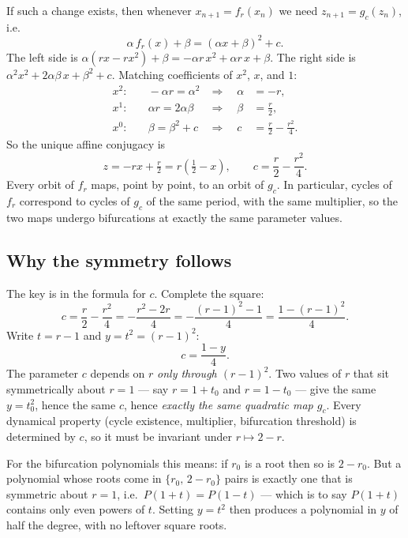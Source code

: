 \documentclass[11pt]{article}
\begin{document}
If such a change exists, then whenever $x_{n+1}=f_r(x_n)$ we need
$z_{n+1}=g_c(z_n)$, i.e.\
\[
\alpha\, f_r(x) + \beta = (\alpha x+\beta)^2 + c.
\]
The left side is $\alpha(rx-rx^2)+\beta = -\alpha r\,x^2 + \alpha r\,x+\beta$.
The right side is $\alpha^2 x^2+2\alpha\beta\,x+\beta^2+c$.  Matching
coefficients of $x^2$, $x$, and $1$:
\begin{align*}
x^2\!: & \quad -\alpha r = \alpha^2
        & \Longrightarrow\quad \alpha &= -r, \\
x^1\!: & \quad \alpha r = 2\alpha\beta
        & \Longrightarrow\quad \beta &= \tfrac{r}{2}, \\
x^0\!: & \quad \beta = \beta^2+c
        & \Longrightarrow\quad c &= \tfrac{r}{2}-\tfrac{r^2}{4}.
\end{align*}
So the unique affine conjugacy is
\begin{equation}
\label{eq:conjugacy}
z = -r x + \tfrac{r}{2} = r\!\left(\tfrac12 - x\right), \qquad
c = \frac{r}{2} - \frac{r^2}{4}.
\end{equation}
Every orbit of $f_r$ maps, point by point, to an orbit of $g_c$.  In
particular, cycles of $f_r$ correspond to cycles of $g_c$ of the same period,
with the same multiplier, so the two maps undergo bifurcations at exactly the
same parameter values.

\subsection{Why the symmetry follows}

The key is in the formula for $c$.  Complete the square:
\begin{equation}
\label{eq:c-of-y}
c = \frac{r}{2}-\frac{r^2}{4}
  = -\frac{r^2-2r}{4}
  = -\frac{(r-1)^2-1}{4}
  = \frac{1-(r-1)^2}{4}.
\end{equation}
Write $t=r-1$ and $y=t^2=(r-1)^2$:
\[
c = \frac{1-y}{4}.
\]
The parameter $c$ depends on $r$ \emph{only through $(r-1)^2$}.  Two values of
$r$ that sit symmetrically about $r=1$ --- say $r=1+t_0$ and $r=1-t_0$ ---
give the same $y=t_0^2$, hence the same $c$, hence \emph{exactly the same
quadratic map $g_c$}.  Every dynamical property (cycle existence, multiplier,
bifurcation threshold) is determined by $c$, so it must be invariant under
$r\mapsto 2-r$.

For the bifurcation polynomials this means: if $r_0$ is a root then so is
$2-r_0$.  But a polynomial whose roots come in $\{r_0,\,2-r_0\}$ pairs is
exactly one that is symmetric about $r=1$, i.e.\ $P(1+t)=P(1-t)$ --- which is
to say $P(1+t)$ contains only even powers of $t$.  Setting $y=t^2$ then
produces a polynomial in $y$ of half the degree, with no leftover square roots.
\end{document}
